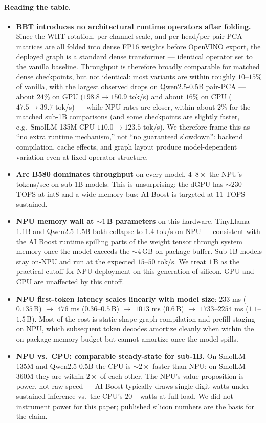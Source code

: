 \documentclass[11pt]{article}
\begin{document}
\paragraph{Reading the table.}
\begin{itemize}
    \item \textbf{BBT introduces no architectural runtime operators after folding.} Since the WHT rotation, per-channel scale, and per-head/per-pair PCA matrices are all folded into dense FP16 weights before OpenVINO export, the deployed graph is a standard dense transformer --- identical operator set to the vanilla baseline. Throughput is therefore broadly comparable for matched dense checkpoints, but not identical: most variants are within roughly $10$--$15\%$ of vanilla, with the largest observed drops on Qwen2.5-0.5B pair-PCA --- about $24\%$ on GPU ($198.8 \to 150.9$ tok/s) and about $16\%$ on CPU ($47.5 \to 39.7$ tok/s) --- while NPU rates are closer, within about $2\%$ for the matched sub-1B comparisons (and some checkpoints are slightly faster, e.g.\ SmolLM-135M CPU $110.0 \to 123.5$ tok/s). We therefore frame this as ``no extra runtime mechanism,'' not ``no guaranteed slowdown'': backend compilation, cache effects, and graph layout produce model-dependent variation even at fixed operator structure.
    \item \textbf{Arc B580 dominates throughput} on every model, $4$--$8\times$ the NPU's tokens/sec on sub-1B models. This is unsurprising: the dGPU has $\sim 230$ TOPS at int8 and a wide memory bus; AI Boost is targeted at $11$ TOPS sustained.
    \item \textbf{NPU memory wall at $\sim 1$\,B parameters} on this hardware. TinyLlama-1.1B and Qwen2.5-1.5B both collapse to $1.4$ tok/s on NPU --- consistent with the AI Boost runtime spilling parts of the weight tensor through system memory once the model exceeds the $\sim 4$\,GB on-package buffer. Sub-1B models stay on-NPU and run at the expected $15$--$50$ tok/s. We treat $1$\,B as the practical cutoff for NPU deployment on this generation of silicon. GPU and CPU are unaffected by this cutoff.
    \item \textbf{NPU first-token latency scales linearly with model size}: $233$ ms ($0.135$\,B) $\to$ $476$ ms ($0.36$--$0.5$\,B) $\to$ $1013$ ms ($0.6$\,B) $\to$ $1733$--$2254$ ms ($1.1$--$1.5$\,B). Most of the cost is static-shape graph compilation and prefill staging on NPU, which subsequent token decodes amortize cleanly when within the on-package memory budget but cannot amortize once the model spills.
    \item \textbf{NPU vs.\ CPU: comparable steady-state for sub-1B.} On SmolLM-135M and Qwen2.5-0.5B the CPU is $\sim 2\times$ faster than NPU; on SmolLM-360M they are within $2\times$ of each other. The NPU's value proposition is power, not raw speed --- AI Boost typically draws single-digit watts under sustained inference vs.\ the CPU's $20$+ watts at full load. We did not instrument power for this paper; published silicon numbers are the basis for the claim.
\end{itemize}
\end{document}
